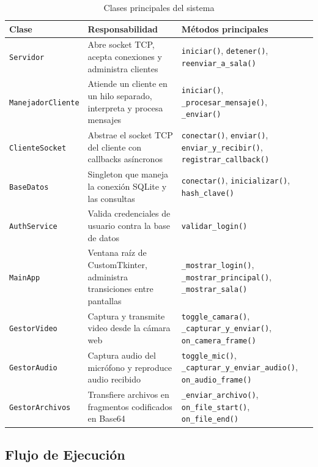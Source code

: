 \documentclass[12pt,a4paper]{article}
\begin{document}
\begin{table}[H]
\centering
\small
\begin{tabular}{p{3cm}p{5cm}p{7cm}}
\toprule
\textbf{Clase} & \textbf{Responsabilidad} & \textbf{M\'etodos principales} \\
\midrule
\texttt{Servidor} & Abre socket TCP, acepta conexiones y administra clientes & \texttt{iniciar()}, \texttt{detener()}, \texttt{reenviar\_a\_sala()} \\
\hline
\texttt{ManejadorCliente} & Atiende un cliente en un hilo separado, interpreta y procesa mensajes & \texttt{iniciar()}, \texttt{\_procesar\_mensaje()}, \texttt{\_enviar()} \\
\hline
\texttt{ClienteSocket} & Abstrae el socket TCP del cliente con callbacks as\'incronos & \texttt{conectar()}, \texttt{enviar()}, \texttt{enviar\_y\_recibir()}, \texttt{registrar\_callback()} \\
\hline
\texttt{BaseDatos} & Singleton que maneja la conexi\'on SQLite y las consultas & \texttt{conectar()}, \texttt{inicializar()}, \texttt{hash\_clave()} \\
\hline
\texttt{AuthService} & Valida credenciales de usuario contra la base de datos & \texttt{validar\_login()} \\
\hline
\texttt{MainApp} & Ventana ra\'iz de CustomTkinter, administra transiciones entre pantallas & \texttt{\_mostrar\_login()}, \texttt{\_mostrar\_principal()}, \texttt{\_mostrar\_sala()} \\
\hline
\texttt{GestorVideo} & Captura y transmite video desde la c\'amara web & \texttt{toggle\_camara()}, \texttt{\_capturar\_y\_enviar()}, \texttt{on\_camera\_frame()} \\
\hline
\texttt{GestorAudio} & Captura audio del micr\'ofono y reproduce audio recibido & \texttt{toggle\_mic()}, \texttt{\_capturar\_y\_enviar\_audio()}, \texttt{on\_audio\_frame()} \\
\hline
\texttt{GestorArchivos}     & Transfiere archivos en fragmentos codificados en Base64 & \texttt{\_enviar\_archivo()}, \texttt{on\_file\_start()}, \texttt{on\_file\_end()} \\
\bottomrule
\end{tabular}
\caption{Clases principales del sistema}
\end{table}

\subsection{Flujo de Ejecuci\'on}
\end{document}
